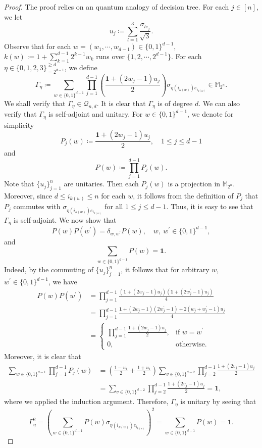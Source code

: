 \documentclass{amsbook}
\theoremstyle{definition}
\theoremstyle{remark}
\numberwithin{section}{chapter}
\numberwithin{equation}{chapter}
\newcommand{\M}{\mathbb{M}}
\newcommand{\1}{\mathbf{1}}
\begin{document}
\begin{proof}
The proof relies on an quantum analogy of decision tree.  For each $j\in [n]$, we let
\begin{equation}\label{uj}
u_{j}\coloneqq \sum_{l=1}^{3}\frac{\sigma_{le_j}}{\sqrt{3}}.
\end{equation}
Observe that for each $w=(w_1,\cdots,w_{d-1})\in\{0,1\}^{d-1}$, $k(w):=1+\sum_{k=1}^{d-1}2^{k-1}w_{k}$ runs over $\{1,2,\cdots,2^{d-1}\}$. 
For each $\eta\in \{0,1,2,3\}^{\geq d}_{=2^{d-1}}$, we define
\[
\Gamma_{\eta}\coloneqq\sum_{w\in\{0,1\}^{d-1}}\prod_{j=1}^{d-1}\left(\frac{\mathbf 1+(2w_{j}-1)u_{j}}{2}\right)\sigma_{\eta(i_{k(w)})e_{i_{k(w)}}}\in \M_{2^n}.
\]
We shall verify that $\Gamma_{\eta}\in \mathcal{Q}_{n,d}$. It is clear that $\Gamma_{\eta}$ is  of degree $d$. We can also verify that $\Gamma_{\eta}$ is self-adjoint and unitary. For $w\in \{0,1\}^{d-1}$, we denote  for simplicity
$$P_j(w)\coloneqq \frac{\mathbf{1}+(2w_{j}-1)u_{j}}{2},\quad 1\leq j\leq d-1$$
 and
 $$P(w)\coloneqq \prod_{j=1}^{d-1}P_j(w).$$
 Note that $\{u_{j}\}_{j=1}^{n}$ are unitaries. Then each $P_j(w)$ is a projection in $\mathbb{M}_{2^n}$. 
Moreover, since $d\leq i_{k(w)}\leq n$ for each $w$, it follows from the definition of $P_j$ that $P_j$ commutes with  $\sigma_{\eta(i_{k(w)})e_{i_{k(w)}}}$ for all $1\leq j\leq d-1$. Thus, it is easy to see that $\Gamma_{\eta}$ is self-adjoint. 
We now show that
\[
P(w)P(w^{\prime})=\delta_{w,w^{\prime}}P(w),\quad w,~w^{\prime}\in \{0,1\}^{d-1},
\]
and 
$$\sum_{w\in \{0,1\}^{d-1}}P(w)=\mathbf{1}.$$ Indeed, by the commuting of $\{u_{j}\}_{j=1}^{n}$, it follows that for arbitrary $w$, $w^{\prime}\in \{0,1\}^{d-1}$, we have
\begin{align*}
P(w)P(w^{\prime})&=\prod_{j=1}^{d-1}\frac{(\mathbf{1}+(2w_{j}-1)u_{j})(\mathbf{1}+(2w^{\prime}_{j}-1)u_{j})}{4}\\
&=\prod_{j=1}^{d-1}\frac{\mathbf{1}+(2w_{j}-1)(2w^{\prime}_{j}-1)+2(w_{j}+w^{\prime}_{j}-1)u_{j}}{4}\\
&=
\begin{cases}
\prod_{j=1}^{d-1}\frac{1+(2w_{j}-1)u_{j}}{2},&\mbox{if }w=w^{\prime}\\
0,&\mbox{otherwise}.
\end{cases}
\end{align*}
Moreover, it is clear that
\begin{align*}
\sum_{w\in \{0,1\}^{d-1}}\prod_{j=1}^{d-1}P_j(w)&=\left(\frac{1-u_{1}}{2}+\frac{1+u_{1}}{2}\right)\sum_{v\in \{0,1\}^{d-2}}\prod_{j=2}^{d-1}\frac{1+(2v_{j}-1)u_{j}}{2}\\
&=\sum_{v\in \{0,1\}^{d-2}}\prod_{j=2}^{d-1}\frac{1+(2v_{j}-1)u_{j}}{2}=\mathbf{1},
\end{align*}
where we applied the induction argument. Therefore, $\Gamma_{\eta}$ is unitary by seeing that
\[
\Gamma_{\eta}^{2}=\left(\sum_{w\in \{0,1\}^{d-1}}P(w)\sigma_{\eta(i_{k(w)})e_{i_{k(w)}}}\right)^{2}=\sum_{w\in \{0,1\}^{d-1}}P(w)=\mathbf{1}.
\]


\end{proof}
\end{document}
